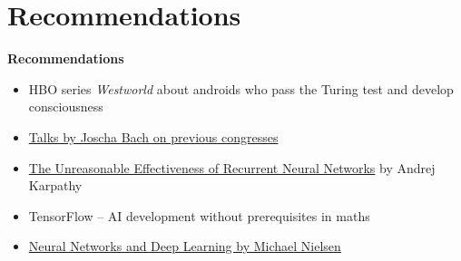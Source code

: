 \documentclass[12pt,compress,english,utf8,t]{beamer}
\renewcommand{\_}{\mathpunct{.}\,}
\newcommand{\hil}[1]{{\usebeamercolor[fg]{item}{\textbf{#1}}}}
\begin{document}
\section{Recommendations}

{
\begin{frame}
  \centering
  \bigskip\bigskip

  \Huge \hil{Part V}

  \bigskip
  \Large\textbf{Recommendations}
  \par

  \vfill\small
  \begin{itemize}
    \item HBO series \emph{Westworld} about androids who pass the Turing test
    and develop consciousness
    \item \href{https://www.youtube.com/watch?v=lKQ0yaEJjok}{Talks by
    Joscha Bach on previous congresses}
    \item \href{https://karpathy.github.io/2015/05/21/rnn-effectiveness/}{The
    Unreasonable Effectiveness of Recurrent Neural Networks} by Andrej
    Karpathy
    \item TensorFlow -- AI development without prerequisites in maths
    \item \href{http://neuralnetworksanddeeplearning.com/}{Neural Networks and Deep Learning by Michael Nielsen}
  \end{itemize}
\end{frame}}
\end{document}

